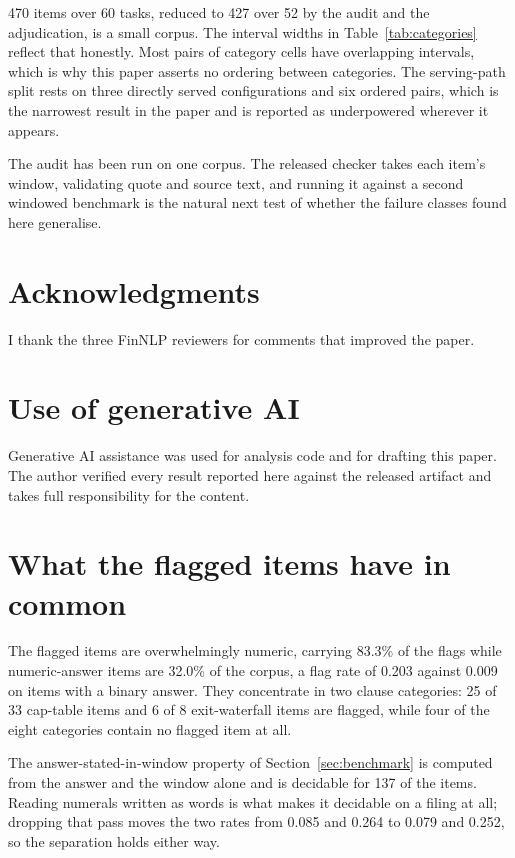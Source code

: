 \documentclass[11pt]{article}
\begin{document}
470 items over 60 tasks, reduced to 427 over 52 by the audit and the adjudication, is a small
corpus. The interval widths in Table~\ref{tab:categories} reflect that honestly. Most pairs of
category cells have overlapping intervals, which is why this paper asserts no ordering between
categories. The serving-path split rests on three directly served configurations and six ordered
pairs,
which is the narrowest result in the paper and is reported as underpowered wherever it appears.

The audit has been run on one corpus. The released checker takes each item's window, validating
quote and source text, and running it against a second windowed benchmark is the natural next
test of whether the failure classes found here generalise.

\section*{Acknowledgments}

I thank the three FinNLP reviewers for comments that improved the paper.

\section*{Use of generative AI}

Generative AI assistance was used for analysis code and for drafting this paper. The author
verified every result reported here against the released artifact and takes full responsibility for
the content.



\appendix



\section{What the flagged items have in common}
\label{sec:composition}

The flagged items are overwhelmingly numeric, carrying 83.3\% of the flags while numeric-answer
items are 32.0\% of the corpus, a flag rate of 0.203 against 0.009 on items with a binary answer.
They concentrate in two clause categories: 25 of 33 cap-table items and 6 of 8 exit-waterfall items
are flagged, while four of the eight categories contain no flagged item at all.

The answer-stated-in-window property of Section~\ref{sec:benchmark} is computed from the answer and
the window alone and is decidable for 137 of the items. Reading numerals written as words is what
makes it decidable on a filing at all; dropping that pass moves the two rates from 0.085 and 0.264
to 0.079 and 0.252, so the separation holds either way.
\end{document}
